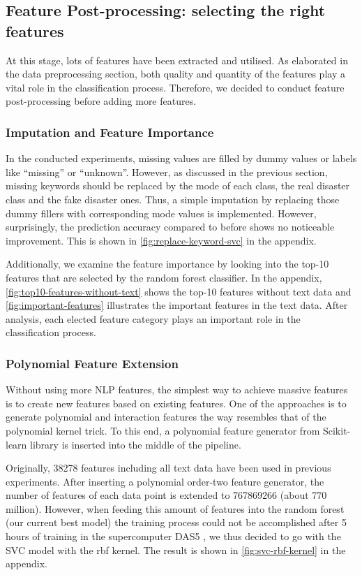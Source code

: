 \subsection{Feature Post-processing: selecting the right features}
At this stage, lots of features have been extracted and utilised.
As elaborated in the data preprocessing section, both quality and quantity of the features play a vital role in the classification process.
Therefore, we decided to conduct feature post-processing before adding more features.

\subsubsection{Imputation and Feature Importance}

In the conducted experiments, missing values are filled by dummy values or labels like ``missing'' or ``unknown''.
However, as discussed in the previous section, missing keywords should be replaced by the mode of each class, the real disaster class and the fake disaster ones.
Thus, a simple imputation by replacing those dummy fillers with corresponding mode values is implemented.
However, surprisingly, the prediction accuracy compared to before shows no noticeable improvement.
This is shown in \autoref{fig:replace-keyword-svc} in the appendix.

Additionally, we examine the feature importance by looking into the top-10 features that are selected by the random forest classifier.
In the appendix, \autoref{fig:top10-features-without-text} shows the top-10 features without text data and  \autoref{fig:important-features} illustrates the important features in the text data.
After analysis, each elected feature category plays an important role in the classification process.

\subsubsection{Polynomial Feature Extension}

Without using more NLP features, the simplest way to achieve massive features is to create new features based on existing features.
One of the approaches is to generate polynomial and interaction features the way resembles that of the polynomial kernel trick.
To this end, a polynomial feature generator from Scikit-learn library is inserted into the middle of the pipeline.

Originally, 38278 features including all text data have been used in previous experiments.
After inserting a polynomial order-two feature generator, the number of features of each data point is extended to 767869266 (about 770 million).
However, when feeding this amount of features into the random forest (our current best model) the training process could not be accomplished after 5
hours of training in the supercomputer DAS5 \cite{x5}, we thus decided to go with the SVC model with the rbf kernel.
The result is shown in \autoref{fig:svc-rbf-kernel} in the appendix.

